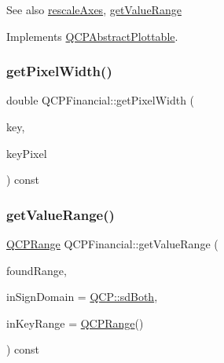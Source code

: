 \begin{DoxySeeAlso}{See also}
\mbox{\hyperlink{class_q_c_p_abstract_plottable_a1491c4a606bccd2d09e65e11b79eb882}{rescale\+Axes}}, \mbox{\hyperlink{class_q_c_p_financial_a82d862aa134d78853f98f8c57a03415b}{get\+Value\+Range}} 
\end{DoxySeeAlso}


Implements \mbox{\hyperlink{class_q_c_p_abstract_plottable_a4da16d3cd4b509e1104a9b0275623c96}{Q\+C\+P\+Abstract\+Plottable}}.

\mbox{\label{class_q_c_p_financial_a3ff49384a95233140c8205af77c08955}} 
\subsubsection{\texorpdfstring{getPixelWidth()}{getPixelWidth()}}
{\footnotesize\ttfamily double Q\+C\+P\+Financial\+::get\+Pixel\+Width (\begin{DoxyParamCaption}\item[{double}]{key,  }\item[{double}]{key\+Pixel }\end{DoxyParamCaption}) const\hspace{0.3cm}{\ttfamily [protected]}}

\mbox{\label{class_q_c_p_financial_a82d862aa134d78853f98f8c57a03415b}} 
\subsubsection{\texorpdfstring{getValueRange()}{getValueRange()}}
{\footnotesize\ttfamily \mbox{\hyperlink{class_q_c_p_range}{Q\+C\+P\+Range}} Q\+C\+P\+Financial\+::get\+Value\+Range (\begin{DoxyParamCaption}\item[{bool \&}]{found\+Range,  }\item[{\mbox{\hyperlink{namespace_q_c_p_afd50e7cf431af385614987d8553ff8a9}{Q\+C\+P\+::\+Sign\+Domain}}}]{in\+Sign\+Domain = {\ttfamily \mbox{\hyperlink{namespace_q_c_p_afd50e7cf431af385614987d8553ff8a9aa38352ef02d51ddfa4399d9551566e24}{Q\+C\+P\+::sd\+Both}}},  }\item[{const \mbox{\hyperlink{class_q_c_p_range}{Q\+C\+P\+Range}} \&}]{in\+Key\+Range = {\ttfamily \mbox{\hyperlink{class_q_c_p_range}{Q\+C\+P\+Range}}()} }\end{DoxyParamCaption}) const\hspace{0.3cm}{\ttfamily [virtual]}}

